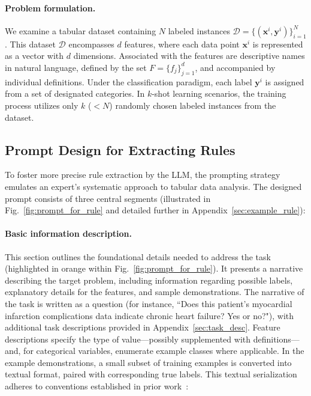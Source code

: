 \vspace*{-0.12in}
\paragraph{Problem formulation.} We examine a tabular dataset containing $N$ labeled instances $\mathcal{D} = \{(\mathbf{x}^i, \mathbf{y}^i)\}_{i=1}^{N}$. This dataset $\mathcal{D}$ encompasses $d$ features, where each data point $\mathbf{x}^i$ is represented as a vector with $d$ dimensions. Associated with the features are descriptive names in natural language, defined by the set $F = \{f_j\}_{j=1}^{d}$, and accompanied by individual definitions. Under the classification paradigm, each label $\mathbf{y}^i$ is assigned from a set of designated categories. In $k$-shot learning scenarios, the training process utilizes only $k$ ($<N$) randomly chosen labeled instances from the dataset.

\subsection{Prompt Design for Extracting Rules}
\label{Sec:prompt_design}
To foster more precise rule extraction by the LLM, the prompting strategy emulates an expert's systematic approach to tabular data analysis. The designed prompt consists of three central segments (illustrated in Fig.~\ref{fig:prompt_for_rule} and detailed further in Appendix~\ref{sec:example_rule}):

\vspace*{-0.12in}
\paragraph{Basic information description.} This section outlines the foundational details needed to address the task (highlighted in orange within Fig.~\ref{fig:prompt_for_rule}). It presents a narrative describing the target problem, including information regarding possible labels, explanatory details for the features, and sample demonstrations. The narrative of the task is written as a question (for instance, ``Does this patient's myocardial infarction complications data indicate chronic heart failure? Yes or no?"), with additional task descriptions provided in Appendix~\ref{sec:task_desc}. Feature descriptions specify the type of value—possibly supplemented with definitions—and, for categorical variables, enumerate example classes where applicable. In the example demonstrations, a small subset of training examples is converted into textual format, paired with corresponding true labels. This textual serialization adheres to conventions established in prior work~\cite{dinh2022lift,hegselmann2023tabllm}:

